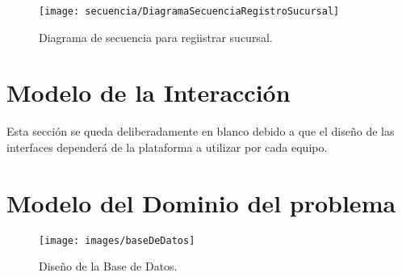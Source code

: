 \documentclass[oneside,10pt]{book}
\begin{document}
	\newpage
	
	\begin{figure}[htbp!]
		\centering
			\texttt{[image: secuencia/DiagramaSecuenciaRegistroSucursal]}
		\caption{Diagrama de secuencia para regiistrar sucursal.}
	\end{figure}


\chapter{Modelo de la Interacción}

{\color{UCInterfaceColor} 
	Esta sección se queda deliberadamente en blanco debido a que el diseño de las interfaces dependerá de la plataforma a utilizar por cada equipo.\\	
}


\chapter{Modelo del Dominio del problema}

	\begin{figure}[htbp!]
		\centering
			\texttt{[image: images/baseDeDatos]}
		\caption{Diseño de la Base de Datos.}
	\end{figure}
	
\end{document}
